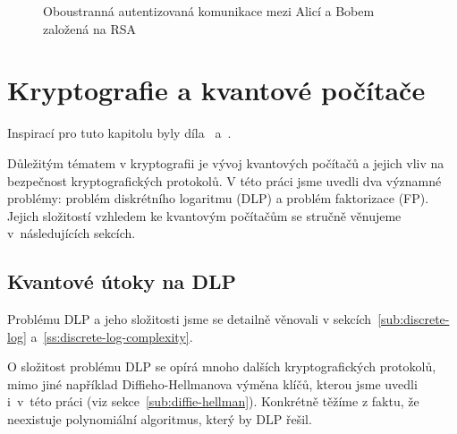 \documentclass[
  program=infoi,
  biblatex=false,
  figures=true,
  glossaries,
  tables=false,
  sourcecodes=true,
  index
]{kidiplom}
\begin{document}
\begin{figure}
    \caption{Oboustranná autentizovaná komunikace mezi Alicí a Bobem založená na RSA}\label{fig:RSA-communication}
    \end{figure}

    \newpage


\section{Kryptografie a kvantové počítače}\label{sec:quantum-computers}

    Inspirací pro tuto kapitolu byly díla~\cite{graduate-course} a~\cite{theory-and-practice}.

    Důležitým tématem v kryptografii je vývoj kvantových počítačů a jejich vliv na bezpečnost kryptografických protokolů.
    V této práci jsme uvedli dva významné problémy: problém diskrétního logaritmu (DLP) a problém faktorizace (FP).
    Jejich složitostí vzhledem ke kvantovým počítačům se stručně věnujeme v~následujících sekcích.
    

    \subsection{Kvantové útoky na DLP}\label{sub:quantum-discrete-log}

        Problému DLP a jeho složitosti jsme se detailně věnovali v sekcích~\ref{sub:discrete-log} a~\ref{ss:discrete-log-complexity}.

        O složitost problému DLP se opírá mnoho dalších kryptografických protokolů, mimo jiné
        například Diffieho-Hellmanova výměna klíčů, kterou jsme uvedli i~v~této práci (viz sekce~\ref{sub:diffie-hellman}).
        Konkrétně těžíme z faktu, že neexistuje polynomiální algoritmus, který by DLP řešil.
\end{document}
